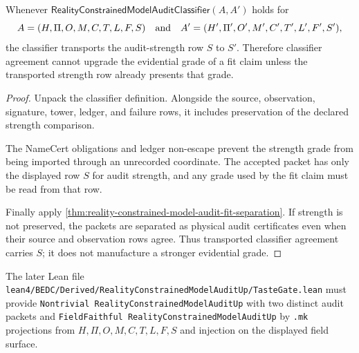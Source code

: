 \begin{theorem}
\label{thm:reality-constrained-model-audit-strength-row-transport}
Whenever $\mathsf{RealityConstrainedModelAuditClassifier}(A,A')$ holds for
$$
A=(H,\Pi,O,M,C,T,L,F,S)
\quad\hbox{and}\quad
A'=(H',\Pi',O',M',C',T',L',F',S'),
$$
the classifier transports the audit-strength row $S$ to $S'$. Therefore classifier agreement cannot upgrade the evidential grade of a fit claim unless the transported strength row already presents that grade.
\end{theorem}
\begin{proof}
Unpack the classifier definition. Alongside the source, observation, signature, tower, ledger, and failure rows, it includes preservation of the declared strength comparison.

The NameCert obligations and ledger non-escape prevent the strength grade from being imported through an unrecorded coordinate. The accepted packet has only the displayed row $S$ for audit strength, and any grade used by the fit claim must be read from that row.

Finally apply \autoref{thm:reality-constrained-model-audit-fit-separation}. If strength is not preserved, the packets are separated as physical audit certificates even when their source and observation rows agree. Thus transported classifier agreement carries $S$; it does not manufacture a stronger evidential grade.
\end{proof}

The later Lean file \texttt{lean4/BEDC/Derived/RealityConstrainedModelAuditUp/TasteGate.lean} must provide \texttt{Nontrivial RealityConstrainedModelAuditUp} with two distinct audit packets and \texttt{FieldFaithful RealityConstrainedModelAuditUp} by \texttt{.mk} projections from $H,\Pi,O,M,C,T,L,F,S$ and injection on the displayed field surface.



